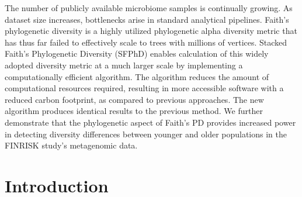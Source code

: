 \glsresetall

The number of publicly available microbiome samples is continually growing. As dataset size increases, bottlenecks arise in standard analytical pipelines. Faith’s phylogenetic diversity is a highly utilized phylogenetic alpha diversity metric that has thus far failed to effectively scale to trees with millions of vertices. Stacked Faith's Phylogenetic Diversity (SFPhD) enables calculation of this widely adopted diversity metric at a much larger scale by implementing a computationally efficient algorithm.  The algorithm reduces the amount of computational resources required, resulting in more accessible software with a reduced carbon footprint, as compared to previous approaches. The new algorithm produces identical results to the previous method. We further demonstrate that the phylogenetic aspect of Faith's PD provides increased power in detecting diversity differences between younger and older populations in the FINRISK study's metagenomic data.

\section{Introduction}

